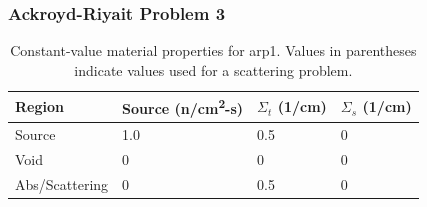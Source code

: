 \begin{frame}
  \frametitle{Ackroyd-Riyait Problem 3}
  
  \begin{table}
    \footnotesize
    \begin{tabular}{llll}
      \toprule
      Region         & Source (n/cm\textsuperscript{2}-s) & $\Sigma_t$ (1/cm) & $\Sigma_s$ (1/cm) \\
      \midrule
      Source         & 1.0                                & 0.5               & 0                 \\
      Void           & 0                                  & 0                 & 0                 \\
      Abs/Scattering & 0                                  & 0.5               & 0                 \\
      \bottomrule
    \end{tabular}
    \caption{\footnotesize Constant-value material properties for \gls{arp1}. Values in parentheses indicate values used for a scattering problem.}
    \label{tab:arp3-props}
  \end{table}
\end{frame}
